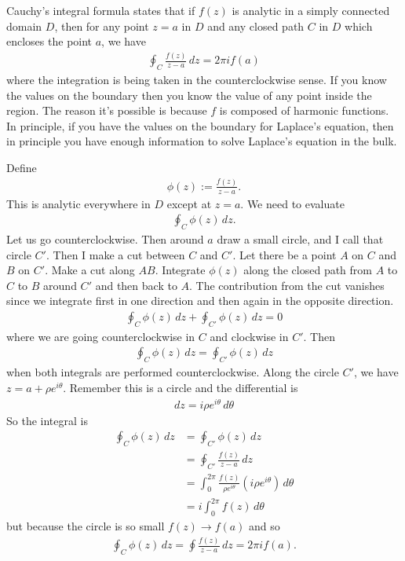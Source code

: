 Cauchy's integral formula states that if $f(z)$ is analytic in a simply
connected domain $D$,
then for any point $z=a$ in $D$ and any closed path $C$ in $D$ which encloses
the point $a$,
we have
\begin{align}
    \oint_C \frac{f(z)}{z - a} \, dz = 2\pi i f(a)
\end{align}
where the integration is being taken in the counterclockwise sense.
If you know the values on the boundary then you know the value of any point
inside the region.
The reason it's possible is because $f$ is composed of harmonic functions.
In principle,
if you have the values on the boundary for Laplace's equation,
then in principle you have enough information to solve Laplace's equation in the
bulk.

Define
\begin{align}
    \phi(z) := \frac{f(z)}{z - a}.
\end{align}
This is analytic everywhere in $D$ except at $z=a$.
We need to evaluate
\begin{align}
    \oint_C \phi(z)\, dz.
\end{align}
Let us go counterclockwise.
Then around $a$ draw a small circle,
and I call that circle $C'$.
Then I make a cut between $C$ and $C'$.
Let there be a point $A$ on $C$ and $B$ on $C'$.
Make a cut along $AB$.
Integrate $\phi(z)$ along the closed path from $A$ to $C$ to $B$
around $C'$ and then back to $A$.
The contribution from the cut vanishes since we integrate first in one
direction and then again in the opposite direction.
\begin{align}
    \oint_C \phi(z)\, dz + \oint_{C'}\phi(z)\, dz = 0
\end{align}
where we are going counterclockwise in $C$ and clockwise in $C'$.
Then
\begin{align}
    \oint_{C}\phi(z)\,dz = \oint_{C'}\phi(z)\,dz
\end{align}
when both integrals are performed counterclockwise.
Along the circle $C'$,
we have
$z=a + \rho e^{i\theta}$.
Remember this is a circle and the differential is
\begin{align}
    dz = i\rho e^{i\theta} \,d\theta
\end{align}
So the integral is
\begin{align}
    \oint_{C}\phi(z)\,dz &= \oint_{C'}\phi(z)\,dz\\
    &=
    \oint_{C'}\frac{f(z)}{z - a} \,dz\\
    &= \int_{0}^{2\pi}\frac{f(z)}{\rho e^{i\theta}}\left( 
        i\rho e^{i\theta}
    \right) \,d\theta\\
    &= i\int_{0}^{2\pi} f(z)\, d\theta
\end{align}
but because the circle is so small $f(z)\to f(a)$ and so
\begin{align}
    \oint_C \phi(z)\, dz
    = \oint \frac{f(z)}{z - a}\,dz
    = 2\pi i f(a).
\end{align}

